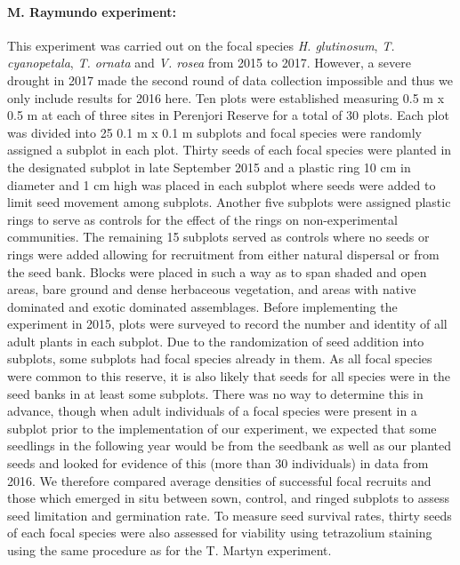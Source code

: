 \begin{refsection}
        \paragraph{M. Raymundo experiment:}
        This experiment was carried out on the focal species \textit{H. glutinosum}, \textit{T. cyanopetala}, \textit{T. ornata} and \textit{V. rosea} from 2015 to 2017. However, a severe drought in 2017 made the second round of data collection impossible and thus we only include results for 2016 here. Ten plots were established measuring 0.5 m x 0.5 m at each of three sites in Perenjori Reserve for a total of 30 plots. Each plot was divided into 25 0.1 m x 0.1 m subplots and focal species were randomly assigned a subplot in each plot. Thirty seeds of each focal species were planted in the designated subplot in late September 2015 and a plastic ring 10 cm in diameter and 1 cm high was placed in each subplot where seeds were added to limit seed movement among subplots. Another five subplots were assigned plastic rings to serve as controls for the effect of the rings on non-experimental communities. The remaining 15 subplots served as controls where no seeds or rings were added allowing for recruitment from either natural dispersal or from the seed bank. Blocks were placed in such a way as to span shaded and open areas, bare ground and dense herbaceous vegetation, and areas with native dominated and exotic dominated assemblages. Before implementing the experiment in 2015, plots were surveyed to record the number and identity of all adult plants in each subplot. Due to the randomization of seed addition into subplots, some subplots had focal species already in them. As all focal species were common to this reserve, it is also likely that seeds for all species were in the seed banks in at least some subplots. There was no way to determine this in advance, though when adult individuals of a focal species were present in a subplot prior to the implementation of our experiment, we expected that some seedlings in the following year would be from the seedbank as well as our planted seeds and looked for evidence of this (more than 30 individuals) in data from 2016. We therefore compared average densities of successful focal recruits and those which emerged in situ between sown, control, and ringed subplots to assess seed limitation and germination rate. To measure seed survival rates, thirty seeds of each focal species were also assessed for viability using tetrazolium staining using the same procedure as for the T. Martyn experiment. 


\end{refsection}
